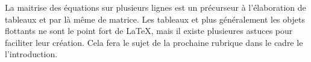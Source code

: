 %
\par La maitrise des équations sur plusieurs lignes est un précurseur à l'élaboration de tableaux et par là même de matrice. Les tableaux et plus généralement les objets flottants ne sont le point fort de \LaTeX{}, mais il existe plusieures astuces pour faciliter leur création. Cela fera le sujet de la prochaine rubrique dans le cadre le l'introduction. 
